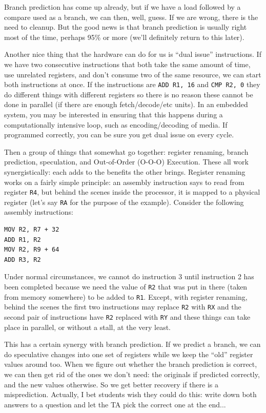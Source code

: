 Branch prediction has come up already, but if we have a load followed by a compare used as a branch, we can then, well, guess. If we are wrong, there is the need to cleanup. But the good news is that branch prediction is usually right most of the time, perhaps 95\% or more (we'll definitely return to this later).

Another nice thing that the hardware can do for us is ``dual issue'' instructions. If we have two consecutive instructions that both take the same amount of time, use unrelated registers, and don't consume two of the same resource, we can start both instructions at once. If the instructions are \texttt{ADD R1, 16} and \texttt{CMP R2, 0} they do different things with different registers so there is no reason these cannot be done in parallel (if there are enough fetch/decode/etc units). In an embedded system, you may be interested in ensuring that this happens during a computationally intensive loop, such as encoding/decoding of media. If programmed correctly, you can be sure you get dual issue on every cycle.

Then a group of things that somewhat go together: register renaming, branch prediction, speculation, and Out-of-Order (O-O-O) Execution. These all work synergistically: each adds to the benefits the other brings. Register renaming works on a fairly simple principle: an assembly instruction says to read from register \texttt{R4}, but behind the scenes inside the processor, it is mapped to a physical register (let's say \texttt{RA} for the purpose of the example). Consider the following assembly instructions:

\begin{verbatim}
MOV R2, R7 + 32
ADD R1, R2
MOV R2, R9 + 64
ADD R3, R2
\end{verbatim}

Under normal circumstances, we cannot do instruction 3 until instruction 2 has been completed because we need the value of \texttt{R2} that was put in there (taken from memory somewhere) to be added to \texttt{R1}. Except, with register renaming, behind the scenes the first two instructions may replace \texttt{R2} with \texttt{RX} and the second pair of instructions have \texttt{R2} replaced with \texttt{RY} and these things can take place in parallel, or without a stall, at the very least.

This has a certain synergy with branch prediction. If we predict a branch, we can do speculative changes into one set of registers while we keep the ``old'' register values around too. When we figure out whether the branch prediction is correct, we can then get rid of the ones we don't need: the originals if predicted correctly, and the new values otherwise. So we get better recovery if there is a misprediction. Actually, I bet students wish they could do this: write down both answers to a question and let the TA pick the correct one at the end...

